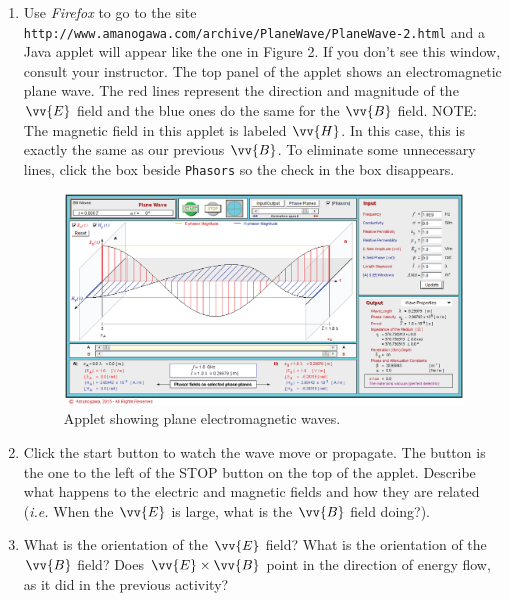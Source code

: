 \begin{enumerate}

\item  Use {\it Firefox} to go to the site
\verb!http://www.amanogawa.com/archive/PlaneWave/PlaneWave-2.html! and a Java applet will appear 
like the one in Figure 2. 
If you don't see this window, consult your instructor.
The top panel of the applet shows an electromagnetic plane wave.
The red lines represent the direction and magnitude of the $\vv {E}$ field and the
blue ones do the same for the $\vv {B}$ field.
NOTE: The magnetic field in this applet is labeled $\vv {H}$.
In this case, this is exactly the same as our previous $\vv {B}$.
To eliminate some unnecessary lines, click the box beside \texttt{Phasors} so the check in the box 
disappears.
\begin{figure}[hbt]
\begin{center}
\includegraphics[width=5.0in]{plane_waves/plane_wave_screenshot.eps}
\caption{Applet showing plane electromagnetic waves.}
\end{center}
\end{figure}

\pagebreak[2]
\item Click the start button to watch the wave move or propagate. The button is the one to the left of the STOP button on the top of the applet.
Describe what happens to the electric and magnetic fields and how they are related
({\it i.e.} When the $\vv {E}$ is large, what is the $\vv {B}$ field doing?).
\vspace{3.0cm}

\item What is the orientation of the $\vv {E}$ field?
What is the orientation of the $\vv {B}$ field?
Does $\vv {E} \times \vv {B}$ point in the direction of energy flow, as it did in the previous activity?
\vspace{2.0cm}


\end{enumerate}

